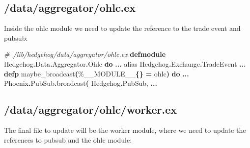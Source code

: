 \documentclass[
  oneside]{book}
\newenvironment{Shaded}{\begin{snugshade}}{\end{snugshade}}
\newcommand{\CommentTok}[1]{\textcolor[rgb]{0.56,0.35,0.01}{\textit{#1}}}
\newcommand{\ConstantTok}[1]{\textcolor[rgb]{0.56,0.35,0.01}{#1}}
\newcommand{\FunctionTok}[1]{\textcolor[rgb]{0.13,0.29,0.53}{\textbf{#1}}}
\newcommand{\ImportTok}[1]{#1}
\newcommand{\KeywordTok}[1]{\textcolor[rgb]{0.13,0.29,0.53}{\textbf{#1}}}
\newcommand{\NormalTok}[1]{#1}
\newcommand{\OperatorTok}[1]{\textcolor[rgb]{0.81,0.36,0.00}{\textbf{#1}}}
\begin{document}
\subsection{/data/aggregator/ohlc.ex}\label{dataaggregatorohlc.ex}

Inside the ohlc module we need to update the reference to the trade event and pubsub:

\begin{Shaded}
\begin{Highlighting}[]
\CommentTok{\# /lib/hedgehog/data/aggregator/ohlc.ex}
\KeywordTok{defmodule} \ConstantTok{Hedgehog}\OperatorTok{.}\ConstantTok{Data}\OperatorTok{.}\ConstantTok{Aggregator}\OperatorTok{.}\ConstantTok{Ohlc} \KeywordTok{do}
  \OperatorTok{...}
  \ImportTok{alias} \ConstantTok{Hedgehog}\OperatorTok{.}\ConstantTok{Exchange}\OperatorTok{.}\ConstantTok{TradeEvent}
  \OperatorTok{...}
  \KeywordTok{defp}\NormalTok{ maybe\_broadcast}\FunctionTok{(}\NormalTok{\%}\ConstantTok{\_\_MODULE\_\_}\FunctionTok{\{\}} \OperatorTok{=}\NormalTok{ ohlc}\FunctionTok{)} \KeywordTok{do}
    \OperatorTok{...}
    \ConstantTok{Phoenix}\OperatorTok{.}\ConstantTok{PubSub}\OperatorTok{.}\NormalTok{broadcast}\FunctionTok{(}
      \ConstantTok{Hedgehog}\OperatorTok{.}\ConstantTok{PubSub}\NormalTok{,}
    \OperatorTok{...}
\end{Highlighting}
\end{Shaded}

\subsection{/data/aggregator/ohlc/worker.ex}\label{dataaggregatorohlcworker.ex}

The final file to update will be the worker module, where we need to update the references to pubsub and the ohlc module:
\end{document}
